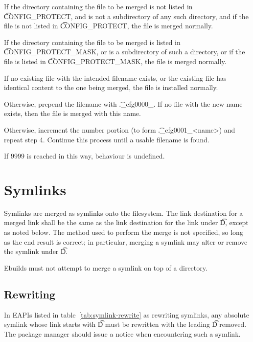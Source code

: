 \begin{compactenum}
\item If the directory containing the file to be merged is not listed in \t{CONFIG_PROTECT}, and is
    not a subdirectory of any such directory, and if the file is not listed in \t{CONFIG_PROTECT},
    the file is merged normally.
\item If the directory containing the file to be merged is listed in \t{CONFIG_PROTECT_MASK}, or
    is a subdirectory of such a directory, or if the file is listed in \t{CONFIG_PROTECT_MASK},
    the file is merged normally.
\item If no existing file with the intended filename exists, or the existing file has identical
    content to the one being merged, the file is installed normally.
\item Otherwise, prepend the filename with \t{._cfg0000_}. If no file with the new name exists,
    then the file is merged with this name.
\item Otherwise, increment the number portion (to form \t{._cfg0001_<name>}) and repeat step 4.
    Continue this process until a usable filename is found.
\item If 9999 is reached in this way, behaviour is undefined.
\end{compactenum}

\section{Symlinks}

Symlinks are merged as symlinks onto the filesystem. The link destination for a merged link shall be
the same as the link destination for the link under \t{D}, except as noted below. The method used to
perform the merge is not specified, so long as the end result is correct; in particular, merging a
symlink may alter or remove the symlink under \t{D}.

Ebuilds must not attempt to merge a symlink on top of a directory.

\subsection{Rewriting}

 In EAPIs listed in table~\ref{tab:symlink-rewrite} as rewriting
symlinks, any absolute symlink whose link starts with \t{D} must be rewritten with the leading
\t{D} removed. The package manager should issue a notice when encountering such a symlink.

